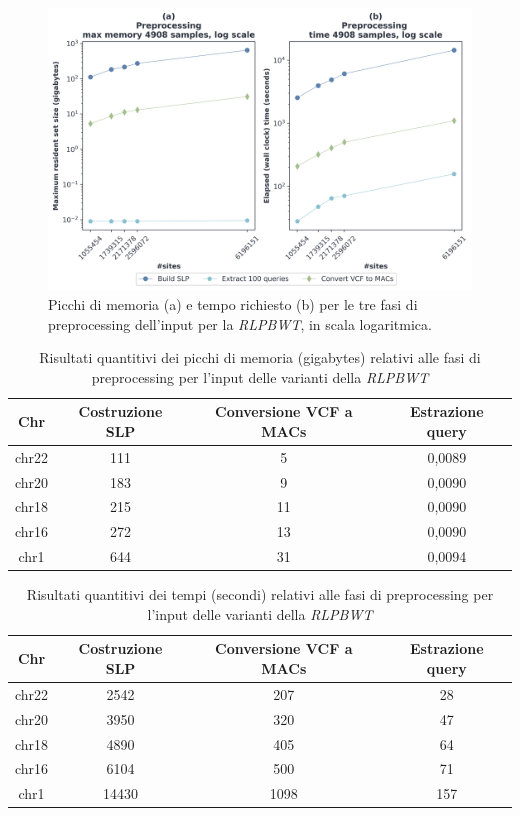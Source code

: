 \begin{figure}
  \centering
  \includegraphics[width=\linewidth]{img/prep_mem_time.png}
  \caption{Picchi di memoria (a) e tempo richiesto (b) per le tre fasi di
    preprocessing dell'input per la \textit{RLPBWT}, in scala logaritmica.}
  \label{fig:prechr}
\end{figure}
\begin{table}
  \centering
  \small
  \caption{Risultati quantitivi dei picchi di memoria (gigabytes) relativi alle
    fasi di 
    preprocessing per l'input delle varianti della \textit{RLPBWT}}
  \label{tab:prepmem}
  \begin{tabular}{c||c|c|c}
    \textbf{Chr} & \textbf{Costruzione SLP} & \textbf{Conversione VCF a MACs}
    & \textbf{Estrazione query}\\
    \hline
    \hline
    chr22 & 111 & 5 & 0,0089  \\
    chr20 & 183 & 9 & 0,0090 \\
    chr18 & 215 & 11 & 0,0090 \\
    chr16 & 272 & 13 & 0,0090 \\
    chr1 & 644 & 31 & 0,0094 
  \end{tabular}
\end{table}
\begin{table}
  \centering
  \small
  \caption{Risultati quantitivi dei tempi (secondi) relativi alle fasi di
    preprocessing per l'input delle varianti della \textit{RLPBWT}}
  \label{tab:preptime}
  \begin{tabular}{c||c|c|c}
    \textbf{Chr} & \textbf{Costruzione SLP} & \textbf{Conversione VCF a MACs}
    & \textbf{Estrazione query}\\
    \hline
    \hline
    chr22 & 2542 & 207 & 28 \\
    chr20 & 3950 & 320 & 47 \\
    chr18 & 4890 & 405 & 64 \\
    chr16 & 6104 & 500 & 71 \\
    chr1 & 14430 & 1098 & 157
  \end{tabular}
\end{table}

